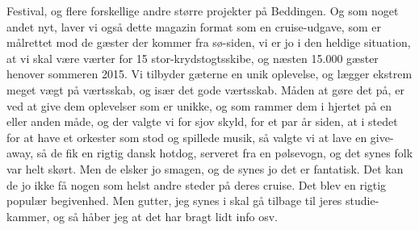 Festival, og flere forskellige andre større projekter på Beddingen. Og som noget andet nyt, laver vi også dette magazin format som en cruise-udgave, som er målrettet mod de gæster der kommer fra sø-siden, vi er jo i den heldige situation, at vi skal være værter for 15 stor-krydstogtsskibe, og næsten 15.000 gæster henover sommeren 2015. Vi tilbyder gæterne en unik oplevelse, og lægger ekstrem meget vægt på værtsskab, og især det gode værtsskab. Måden at gøre det på, er ved at give dem oplevelser som er unikke, og som rammer dem i hjertet på en eller anden måde, og der valgte vi for sjov skyld, for et par år siden, at i stedet for at have et orkester som stod og spillede musik, så valgte vi at lave en give-away, så de fik en rigtig dansk hotdog, serveret fra en pølsevogn, og det synes folk var helt skørt. Men de elsker jo smagen, og de synes jo det er fantatisk. Det kan de jo ikke få nogen som helst andre steder på deres cruise. Det blev en rigtig populær begivenhed. Men gutter, jeg synes i skal gå tilbage til jeres studie-kammer, og så håber jeg at det har bragt lidt info osv. 


